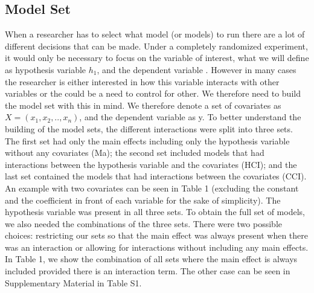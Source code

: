 \subsection{Model Set}
When a researcher has to select what model (or models) to run there are a lot of different decisions that can be made. Under a completely randomized experiment, it would only be necessary to focus on the variable of interest, what we will define as hypothesis variable $h_1$, and the dependent variable \cite{angrist2008mostly}. However in many cases the researcher is either interested in how this variable interacts with other variables or the could be a need to control for other. We therefore need to build the model set with this in mind. We therefore denote a set of covariates as $X=(x_1,x_2,..,x_n)$, and the dependent variable as y. To better understand the building of the model sets, the different interactions were split into three sets. The first set had only the main effects including only the hypothesis variable without any covariates (Ma); the second set included models that had interactions between the hypothesis variable and the covariates (HCI); and the last set contained the models that had interactions between the covariates (CCI). An example with two covariates can be seen in Table 1 (excluding the constant and the coefficient in front of each variable for the sake of simplicity). The hypothesis variable was present in all three sets.
To obtain the full set of models, we also needed the combinations of the three sets. There were two possible choices: restricting our sets so that the main effect was always present when there was an interaction or allowing for interactions without including any main effects. In Table 1, we show the combination of all sets where the main effect is always included provided there is an interaction term. The other case can be seen in Supplementary Material in Table S1. \\
\newpage
